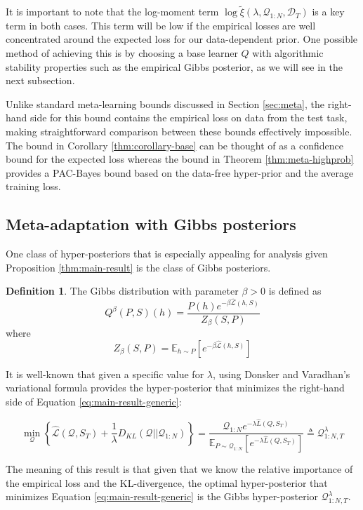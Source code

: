 \documentclass{article}
\theoremstyle{definition}
\newtheorem{defn}{Definition}[section]
\newcommand{\Expect}[2]{\mathbb{E}_{#1}\left [#2 \right ]}
\begin{document}
It is important to note that the log-moment term $\log\tilde{\xi}(\lambda,\mathcal{Q}_{1:N},\mathcal{D}_T)$ is a key term in both cases. This term will be low if the empirical losses are well concentrated around the expected loss for our data-dependent prior. One possible method of achieving this is by choosing a base learner $Q$ with algorithmic stability properties such as the empirical Gibbs posterior, as we will see in the next subsection.

Unlike standard meta-learning bounds discussed in Section \ref{sec:meta}, the right-hand side for this bound contains the empirical loss on data from the test task, making straightforward comparison between these bounds effectively impossible. The bound in Corollary \ref{thm:corollary-base} can be thought of as a confidence bound for the expected loss whereas the bound in Theorem \ref{thm:meta-highprob} provides a PAC-Bayes bound based on the data-free hyper-prior and the average training loss.

\subsection{Meta-adaptation with Gibbs posteriors} \label{sec:adapt-gibbs}

One class of hyper-posteriors that is especially appealing for analysis given Proposition \ref{thm:main-result} is the class of Gibbs posteriors.

\begin{defn} \label{defn:Gibbs}
	The Gibbs distribution with parameter $\beta>0$ is defined as $$Q^\beta(P,S)(h)=\frac{P(h)e^{-\beta \hat{\mathcal{L}}(h,S)}}{Z_\beta(S,P)}$$ 
	where 
	$$Z_\beta(S,P)=\Expect{h\sim P}{e^{-\beta\hat{\mathcal{L}}(h,S)}}$$
\end{defn}

It is well-known \citep{Catoni2004} that given a specific value for $\lambda$, using Donsker and Varadhan’s variational formula \citep{Donsker1975} provides the hyper-posterior that minimizes the right-hand side of Equation \ref{eq:main-result-generic}:

$$\min_{\mathcal{Q}} \left\{ \hat{\mathcal{L}}(\mathcal{Q}, S_T) + \frac{1}{\lambda}D_{KL}(\mathcal{Q}||\mathcal{Q}_{1:N}) \right\} = \frac{\mathcal{Q}_{1:N}e^{-\lambda\hat{L}(Q,S_T)}}{\Expect{P\sim \mathcal{Q}_{1:N}}{e^{-\lambda\hat{L}(Q,S_T)}}}\triangleq \mathcal{Q}^{\lambda}_{1:N,T}$$

The meaning of this result is that given that we know the relative importance of the empirical loss and the KL-divergence, the optimal hyper-posterior that minimizes Equation \ref{eq:main-result-generic} is the Gibbs hyper-posterior $\mathcal{Q}^{\lambda}_{1:N,T}$.
\end{document}
